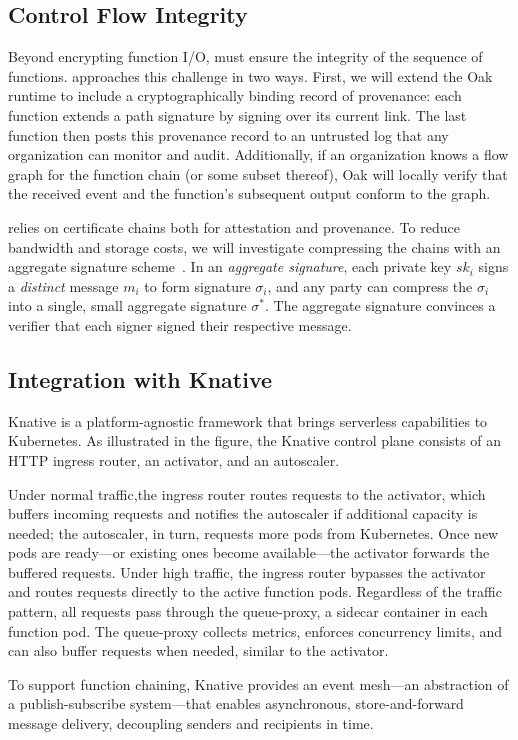 


\subsection{Control Flow Integrity}
%
Beyond encrypting function I/O, \SystemName must ensure the integrity
of the sequence of functions.
%
\SystemName approaches this challenge in two ways.
%
First, we will extend the Oak runtime to include a cryptographically binding record
of provenance: each function extends a path signature by signing over its
current link.
%
The last function then posts this provenance record to an untrusted log that
any organization can monitor and audit.
%
Additionally, if an organization knows a flow graph for the function chain (or
some subset thereof),  Oak will locally verify that the received event and the
function's subsequent output conform to the graph.


\SystemName relies on certificate chains both for attestation and provenance.
%
To reduce bandwidth and storage costs, we will investigate compressing the chains
with an aggregate signature
scheme~\cite{03-eurocrypt-aggregate_signatures_bilinear_maps}.
%
In an \emph{aggregate signature}, each private key $sk_i$ signs a
\emph{distinct} message $m_i$ to form signature $\sigma_i$, and any party can
compress the $\sigma_i$ into a single, small aggregate signature $\sigma^*$.  
%
The aggregate signature convinces a verifier that each signer signed their
respective message.



\subsection{Integration with Knative}

%
%
Knative is a platform-agnostic framework that brings serverless capabilities to
Kubernetes.
%
As illustrated in the figure, the Knative control plane consists
of an HTTP ingress router, an activator, and an autoscaler.


Under normal traffic,the ingress router routes requests to the activator, which
buffers incoming requests and notifies the autoscaler if additional capacity is
needed; the autoscaler, in turn, requests more pods from Kubernetes.
%
Once new pods are ready---or existing ones become available---the activator
forwards the buffered requests.
%
Under high traffic, the ingress router bypasses the activator and routes
requests directly to the active function pods.
%
Regardless of the traffic pattern, all requests pass through the queue-proxy, a
sidecar container in each function pod.
%
The queue-proxy collects metrics, enforces concurrency limits, and can also
buffer requests when needed, similar to the activator.


To support function chaining, Knative provides an event mesh---an abstraction
of a publish-subscribe system---that enables asynchronous, store-and-forward
message delivery, decoupling senders and recipients in time.
